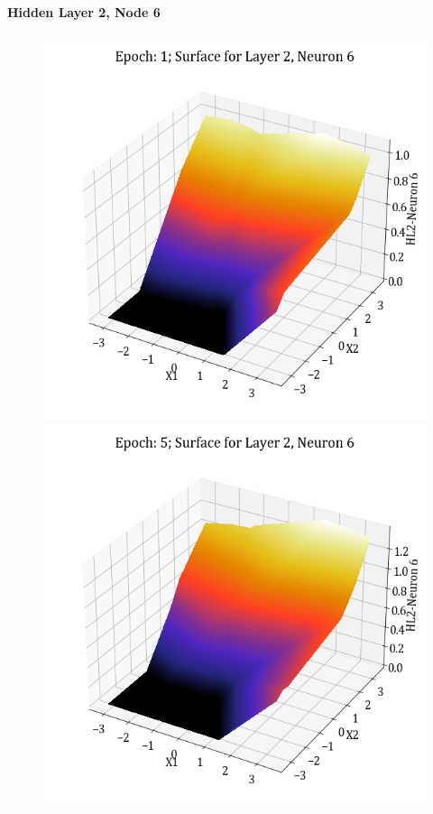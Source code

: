 \documentclass[11pt,a4paper]{article}
\begin{document}
\paragraph{Hidden Layer 2, Node 6}
\begin{figure}[H]
    \centering
    \includegraphics[scale=0.4]{images/1B_MLFFNN_E1_HL2_N6.png}
    \includegraphics[scale=0.4]{images/1B_MLFFNN_E5_HL2_N6.png}

\end{figure}
\end{document}
